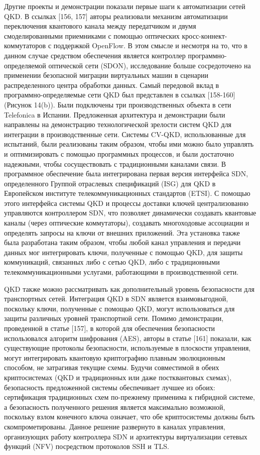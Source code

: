Другие проекты и демонстрации показали первые шаги к автоматизации сетей QKD.
В ссылках [156, 157] авторы реализовали механизм автоматизации переключения квантового канала между передатчиком и двумя смоделированными приемниками с помощью оптических кросс-коннект-коммутаторов с поддержкой OpenFlow. В этом смысле и несмотря на то, что в данном случае средством обеспечения является контроллер программно-определяемой оптической сети (SDON), исследование больше сосредоточено на применении безопасной миграции виртуальных машин в сценарии распределенного центра обработки данных.
Самый передовой вклад в программно-определяемые сети QKD был представлен в ссылках [158-160] (Рисунок 14(b)). Были подключены три производственных объекта в сети Telefonica в Испании. Предложенная архитектура и демонстрации были направлены на демонстрацию технологической зрелости систем QKD для интеграции в производственные сети. Системы CV-QKD, использованные для испытаний, были реализованы таким образом, чтобы ими можно было управлять и оптимизировать с помощью программных процессов, и были достаточно надежными, чтобы сосуществовать с традиционными каналами связи. В программное обеспечение была интегрирована первая версия интерфейса SDN, определенного Группой отраслевых спецификаций (ISG) для QKD в Европейском институте телекоммуникационных стандартов (ETSI). С помощью этого интерфейса системы QKD и процессы доставки ключей централизованно управляются контроллером SDN, что позволяет динамически создавать квантовые каналы (через оптические коммутаторы), создавать многоходовые ассоциации и определять запросы на ключи от внешних приложений. Эта установка также была разработана таким образом, чтобы любой канал управления и передачи данных мог интегрировать ключи, полученные с помощью QKD, для защиты коммуникаций, связанных либо с сетью QKD, либо с традиционными телекоммуникационными услугами, работающими в производственной сети.

QKD также можно рассматривать как дополнительный уровень безопасности для транспортных сетей. Интеграция QKD в SDN является взаимовыгодной, поскольку ключи, полученные с помощью QKD, могут использоваться для защиты различных уровней транспортной сети. Помимо демонстрации, проведенной в статье [157], в которой для обеспечения безопасности использовался алгоритм шифрования (AES), авторы в статье [161] показали, как существующие протоколы безопасности, используемые в плоскости управления, могут интегрировать квантовую криптографию плавным эволюционным способом, не затрагивая текущие схемы. Будучи совместимой в обеих криптосистемах (QKD и традиционных или даже постквантовых схемах), безопасность предложенной системы обеспечивает лучшее из обоих: сертификация традиционных схем по-прежнему применима к гибридной системе, а безопасность полученного решения является максимально возможной, поскольку взлом конечного ключа означает, что обе криптосистемы должны быть скомпрометированы. Данное решение развернуто в каналах управления, организующих работу контроллера SDN и архитектуры виртуализации сетевых функций (NFV) посредством протоколов SSH и TLS.

